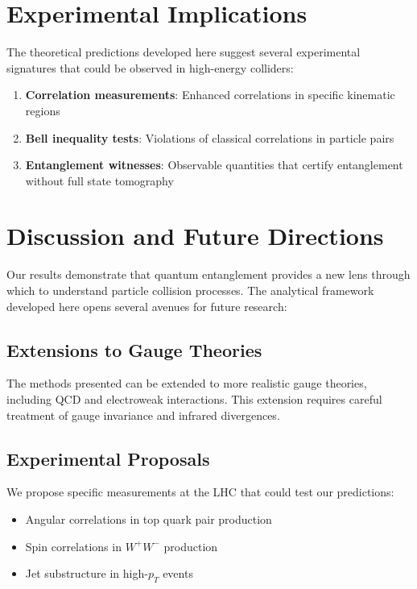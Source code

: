 \documentclass[arxiv,final,oneside,onecolumn]{../../arxiv-preprint}
\begin{document}
\section{Experimental Implications}

The theoretical predictions developed here suggest several experimental signatures 
that could be observed in high-energy colliders:

\begin{enumerate}
\item \textbf{Correlation measurements}: Enhanced correlations in specific 
kinematic regions
\item \textbf{Bell inequality tests}: Violations of classical correlations 
in particle pairs
\item \textbf{Entanglement witnesses}: Observable quantities that certify 
entanglement without full state tomography
\end{enumerate}

\section{Discussion and Future Directions}

Our results demonstrate that quantum entanglement provides a new lens through 
which to understand particle collision processes. The analytical framework 
developed here opens several avenues for future research:

\subsection{Extensions to Gauge Theories}
The methods presented can be extended to more realistic gauge theories, 
including QCD and electroweak interactions. This extension requires careful 
treatment of gauge invariance and infrared divergences.

\subsection{Experimental Proposals}
We propose specific measurements at the LHC that could test our predictions:
\begin{itemize}
\item Angular correlations in top quark pair production
\item Spin correlations in $W^+ W^-$ production
\item Jet substructure in high-$p_T$ events
\end{itemize}
\end{document}
